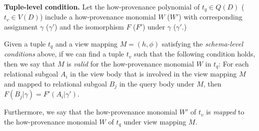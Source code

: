 \begin{definition}
{\bf Tuple-level condition.}
Let the how-pro\-venance polynomial of $t_q \in Q(D)$ ($t_v \in V(D)$) include a how-provenance monomial $W$ ($W'$) with corresponding assignment $\gamma$ ($\gamma'$) and the isomorphism $F$ ($F'$) under $\gamma$ ($\gamma'$.)

Given a tuple $t_q$ and a view mapping $M=(h,\phi)$ satisfying the {\em schema-level conditions} above, if we can find a tuple $t_v$ such that the following condition holds, then we say that $M$ is \textit{valid} for the how-provenance monomial $W$ in $t_q$:
For each relational subgoal $A_i$ in the view body that is involved in the view mapping $M$ and mapped to relational subgoal $B_j$ in the query body under $M$, then $F(B_j|\gamma) = F'(A_i|\gamma')$.


Furthermore, we say that the how-provenance monomial $W'$ of $t_v$ is {\em mapped} to the how-provenance monomial $W$ of $t_q$ under view mapping $M$.

\end{definition}


